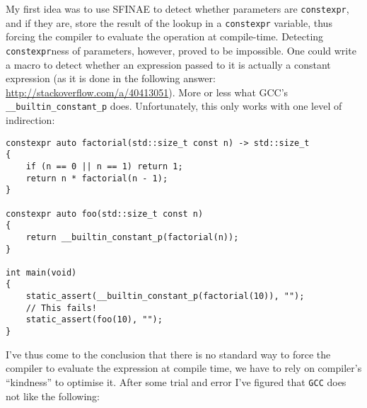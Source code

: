 \documentclass[a4paper,12pt]{article}
\begin{document}
    My first idea was to use SFINAE to detect whether parameters are \texttt{constexpr}, and if they are, store the result of the lookup in a \texttt{constexpr} variable, thus forcing the compiler to evaluate the operation at compile-time. Detecting \texttt{constexpr}ness of parameters, however, proved to be impossible. One could write a macro to detect whether an expression passed to it is actually a constant expression (as it is done in the following answer: \url{http://stackoverflow.com/a/40413051}). More or less what GCC's \texttt{\_\_builtin\_constant\_p} does. Unfortunately, this only works with one level of indirection:
    \begin{spacing}{0.8}
\begin{lstlisting}
constexpr auto factorial(std::size_t const n) -> std::size_t
{
	if (n == 0 || n == 1) return 1;
	return n * factorial(n - 1);
}

constexpr auto foo(std::size_t const n)
{
	return __builtin_constant_p(factorial(n));
}

int main(void)
{
	static_assert(__builtin_constant_p(factorial(10)), "");
	// This fails!
	static_assert(foo(10), "");
}
\end{lstlisting}
    \end{spacing}
    I've thus come to the conclusion that there is no standard way to force the compiler to evaluate the expression at compile time, we have to rely on compiler's ``kindness'' to optimise it. After some trial and error I've figured that \texttt{GCC} does not like the following:
\end{document}
